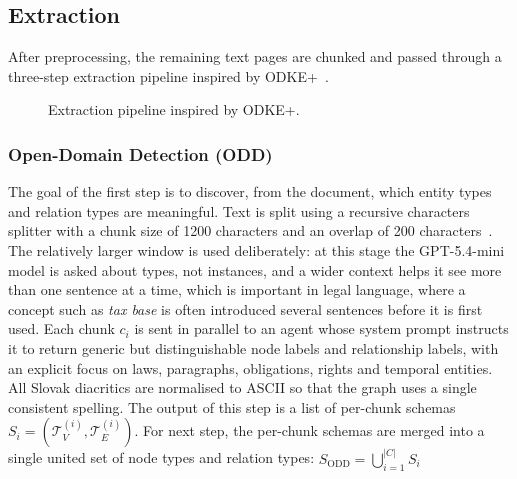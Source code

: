 \documentclass[conference]{IEEEtran}
\begin{document}
\subsection{Extraction}

After preprocessing, the remaining text pages are chunked and passed through a three-step extraction pipeline inspired by ODKE+~\cite{odkeplus2025}.

\begin{figure}[h]
  \centering
\caption{Extraction pipeline inspired by ODKE+.}
\label{fig:extraction}
\end{figure}

\subsubsection{Open-Domain Detection (ODD)}
The goal of the first step is to discover, from the document, which entity types and relation types are meaningful. Text is split using a recursive characters splitter with a chunk size of {1200 characters and an overlap of 200 characters}~\cite{shereshevsky2026}. The relatively larger window is used deliberately: at this stage the GPT-5.4-mini model is asked about types, not instances, and a wider context helps it see more than one sentence at a time, which is important in legal language, where a concept such as \textit{tax base} is often introduced several sentences before it is first used. Each chunk $c_i$ is sent in parallel to an agent whose system prompt instructs it to return generic but distinguishable node labels and relationship labels, with an explicit focus on laws, paragraphs, obligations, rights and temporal entities. All Slovak diacritics are normalised to ASCII so that the graph uses a single consistent spelling. The output of this step is a list of per-chunk schemas $S_i=(\mathcal{T}^{(i)}_V,\mathcal{T}^{(i)}_E)$. For next step, the per-chunk schemas are merged into a single united set of node types and relation types: $S_{\text{ODD}}=\bigcup_{i=1}^{|C|} S_i $
\end{document}
